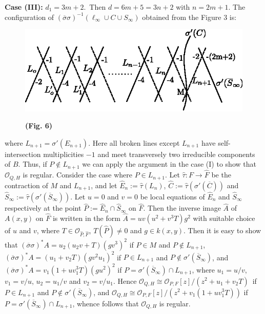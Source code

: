 \medskip
\noindent
{\bf Case (III):} $d_{1}=3m+2$.\pageoriginale\ Then $d=6m+5=3n+2$ with
$n=2m+1$. The 
configuration of $(\overline{\sigma}\sigma)^{-1}(\ell_{\infty}\cup
C\cup S_{\infty})$ obtained from the Figure 3 is:
\begin{figure}[H]
\centering
\includegraphics[scale=1.2]{figures/miyansi_fig6.eps}

\bigskip
\centerline{\bf(Fig. 6)}
\end{figure}
\noindent
where $L_{n+1}=\sigma'(E_{n+1})$. Here all broken lines except
$L_{n+1}$ have self-intersection multiplicities $-1$ and meet
transversely two irreducible components of $B$. Thus, if $P\not\in
L_{n+1}$ we can apply the argument in the case (I) to show that
$\mathscr{O}_{Q,H}$ is regular. Consider the case where $P\in
L_{n+1}$. Let $\widehat{\tau}:F\to \widehat{F}$ be the contraction of
$M$ and $L_{n+1}$, and let $\widehat{E}_{n}:=\widehat{\tau}(L_{n})$,
$\widehat{C}:=\widehat{\tau}(\sigma'(\overline{C}))$ and
$\widehat{S}_{\infty}:=\widehat{\tau}(\sigma'(\overline{S}_{\infty}))$. Let
$u=0$ and $v=0$ be local equations of $\widehat{E}_{n}$ and
$\widehat{S}_{\infty}$ respectively at the point
$\widehat{P}:=\widehat{E}_{n}\cap \widehat{S}_{\infty}$ on
$\widehat{F}$. Then the inverse image $\widehat{A}$ of $A(x,y)$ on
$\widehat{F}$ is written in the form
$\widehat{A}=uv(u^{2}+v^{3}T)g^{2}$ with suitable choice of $u$ and
$v$, where $T\in \mathscr{O}_{\widehat{P},\widehat{F}}$,
$T(\widehat{P})\neq 0$ and $g\in k(x,y)$. Then it is easy to show that
$(\overline{\sigma}\sigma)^{\ast}A=u_{2}(u_{2}v+T)(gv^{3})^{2}$ if
$P\in M$ and $P\not\in L_{n+1}$,
$(\overline{\sigma}\sigma)^{\ast}A=(u_{1}+v_{2}T)(gv^{2}u_{1})^{2}$ if
$P\in L_{n+1}$ and $P\not\in \sigma'(\overline{S}_{\infty})$, and
$(\overline{\sigma}\sigma)^{\ast}A=v_{1}(1+uv^{3}_{1}T)(gu^{2})^{2}$
if $P=\sigma'(\overline{S}_{\infty})\cap L_{n+1}$, where $u_{1}=u/v$,
$v_{1}=v/u$, $u_{2}=u_{1}/v$ and $v_{2}=v/u_{1}$. Hence
$\mathscr{O}_{Q,H}\cong
\mathscr{O}_{P,F}[z]/(z^{2}+u_{1}+v_{2}T)$\pageoriginale\ if $P\in
L_{n+1}$ and $P\not\in \sigma'(\overline{S}_{\infty})$, and
$\mathscr{O}_{Q,H}\cong
\mathscr{O}_{P,F}[z]/(z^{2}+v_{1}(1+uv^{3}_{1}T))$ if
$P=\sigma'(\overline{S}_{\infty})\cap L_{n+1}$, whence follows that
$\mathscr{O}_{Q,H}$ is regular.

